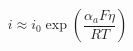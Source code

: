 \documentclass[preview]{standalone}
\begin{document}
\[i \approx i_0 \exp\left(\frac{\alpha_a F \eta}{RT}\right) \tag{2.14}\]
\end{document}
